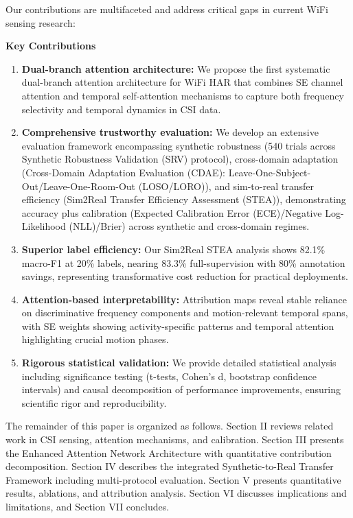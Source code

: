 \documentclass[lettersize,journal]{IEEEtran}
\begin{document}
Our contributions are multifaceted and address critical gaps in current WiFi sensing research:

\textbf{Key Contributions}
\begin{enumerate}
  \item \textbf{Dual-branch attention architecture:} We propose the first systematic dual-branch attention architecture for WiFi HAR that combines SE channel attention and temporal self-attention mechanisms to capture both frequency selectivity and temporal dynamics in CSI data.
  \item \textbf{Comprehensive trustworthy evaluation:} We develop an extensive evaluation framework encompassing synthetic robustness (540 trials across Synthetic Robustness Validation (SRV) protocol), cross-domain adaptation (Cross-Domain Adaptation Evaluation (CDAE): Leave-One-Subject-Out/Leave-One-Room-Out (LOSO/LORO)), and sim-to-real transfer efficiency (Sim2Real Transfer Efficiency Assessment (STEA)), demonstrating accuracy plus calibration (Expected Calibration Error (ECE)/Negative Log-Likelihood (NLL)/Brier) across synthetic and cross-domain regimes.
  \item \textbf{Superior label efficiency:} Our Sim2Real STEA analysis shows 82.1\% macro-F1 at 20\% labels, nearing 83.3\% full-supervision with 80\% annotation savings, representing transformative cost reduction for practical deployments.
  \item \textbf{Attention-based interpretability:} Attribution maps reveal stable reliance on discriminative frequency components and motion-relevant temporal spans, with SE weights showing activity-specific patterns and temporal attention highlighting crucial motion phases.
  \item \textbf{Rigorous statistical validation:} We provide detailed statistical analysis including significance testing (t-tests, Cohen's d, bootstrap confidence intervals) and causal decomposition of performance improvements, ensuring scientific rigor and reproducibility.
\end{enumerate}

The remainder of this paper is organized as follows. Section II reviews related work in CSI sensing, attention mechanisms, and calibration. Section III presents the Enhanced Attention Network Architecture with quantitative contribution decomposition. Section IV describes the integrated Synthetic-to-Real Transfer Framework including multi-protocol evaluation. Section V presents quantitative results, ablations, and attribution analysis. Section VI discusses implications and limitations, and Section VII concludes.
\end{document}
